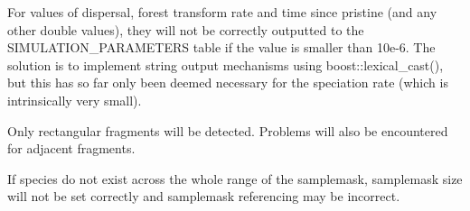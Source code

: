 
\begin{DoxyRefList}
\item[\label{bug__bug000001}%
\hypertarget{bug__bug000001}{}%
Member \hyperlink{class_tree_aec10ea2b720edc13a38310afdfe2b6e4}{CoalescenceTree\+:\+:setup} ()]For values of dispersal, forest transform rate and time since pristine (and any other double values), they will not be correctly outputted to the S\+I\+M\+U\+L\+A\+T\+I\+O\+N\+\_\+\+P\+A\+R\+A\+M\+E\+T\+E\+RS table if the value is smaller than 10e-\/6. The solution is to implement string output mechanisms using boost\+::lexical\+\_\+cast(), but this has so far only been deemed necessary for the speciation rate (which is intrinsically very small).
\item[\label{bug__bug000003}%
\hypertarget{bug__bug000003}{}%
Member \hyperlink{class_treelist_ac0569d1ff2167b24751e490d7d76ac9f}{Treelist\+:\+:calc\+Fragments} (string fragment\+\_\+file)]Only rectangular fragments will be detected. Problems will also be encountered for adjacent fragments.  
\item[\label{bug__bug000002}%
\hypertarget{bug__bug000002}{}%
Member \hyperlink{class_treelist_acaa619f2d186f60c9c9fa5d90db0da68}{Treelist\+:\+:detect\+Dimensions} (string db)]If species do not exist across the whole range of the samplemask, samplemask size will not be set correctly and samplemask referencing may be incorrect. 
\end{DoxyRefList}